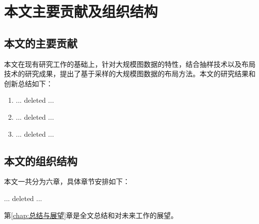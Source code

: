 \section{本文主要贡献及组织结构}


    \subsection{本文的主要贡献}

    本文在现有研究工作的基础上，针对大规模图数据的特性，结合抽样技术以及布局技术的研究成果，提出了基于采样的大规模图数据的布局方法。本文的研究结果和创新总结如下：

    \begin{enumerate}
      \item ... deleted ...
      \item ... deleted ...
      \item ... deleted ...
    \end{enumerate}



    \subsection{本文的组织结构}

    本文一共分为六章，具体章节安排如下：

    ... deleted ...

    第\ref{chap:总结与展望}章是全文总结和对未来工作的展望。
